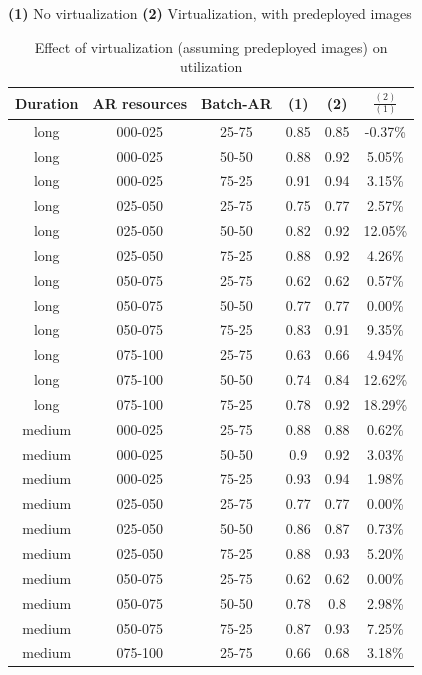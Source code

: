 \begin{table}
\begin{center}
\caption{Effect of virtualization (assuming predeployed images) on utilization}
\textbf{(1)} No virtualization 
\textbf{(2)} Virtualization, with predeployed images
\begin{tabular}{|c|c|c|c|c|c|}
\hline
\textbf{Duration} & \textbf{AR resources} & \textbf{Batch-AR} & \textbf{(1)} & \textbf{(2)} & \textbf{$\frac{(2)}{(1)}$}
\\\hline
long & 000-025 & 25-75 & 0.85 & 0.85 & -0.37\%
\\\hline
long & 000-025 & 50-50 & 0.88 & 0.92 & 5.05\%
\\\hline
long & 000-025 & 75-25 & 0.91 & 0.94 & 3.15\%
\\\hline
long & 025-050 & 25-75 & 0.75 & 0.77 & 2.57\%
\\\hline
long & 025-050 & 50-50 & 0.82 & 0.92 & 12.05\%
\\\hline
long & 025-050 & 75-25 & 0.88 & 0.92 & 4.26\%
\\\hline
long & 050-075 & 25-75 & 0.62 & 0.62 & 0.57\%
\\\hline
long & 050-075 & 50-50 & 0.77 & 0.77 & 0.00\%
\\\hline
long & 050-075 & 75-25 & 0.83 & 0.91 & 9.35\%
\\\hline
long & 075-100 & 25-75 & 0.63 & 0.66 & 4.94\%
\\\hline
long & 075-100 & 50-50 & 0.74 & 0.84 & 12.62\%
\\\hline
long & 075-100 & 75-25 & 0.78 & 0.92 & 18.29\%
\\\hline
medium & 000-025 & 25-75 & 0.88 & 0.88 & 0.62\%
\\\hline
medium & 000-025 & 50-50 & 0.9 & 0.92 & 3.03\%
\\\hline
medium & 000-025 & 75-25 & 0.93 & 0.94 & 1.98\%
\\\hline
medium & 025-050 & 25-75 & 0.77 & 0.77 & 0.00\%
\\\hline
medium & 025-050 & 50-50 & 0.86 & 0.87 & 0.73\%
\\\hline
medium & 025-050 & 75-25 & 0.88 & 0.93 & 5.20\%
\\\hline
medium & 050-075 & 25-75 & 0.62 & 0.62 & 0.00\%
\\\hline
medium & 050-075 & 50-50 & 0.78 & 0.8 & 2.98\%
\\\hline
medium & 050-075 & 75-25 & 0.87 & 0.93 & 7.25\%
\\\hline
medium & 075-100 & 25-75 & 0.66 & 0.68 & 3.18\%
\\\hline

\end{tabular}
\end{center}
\end{table}
